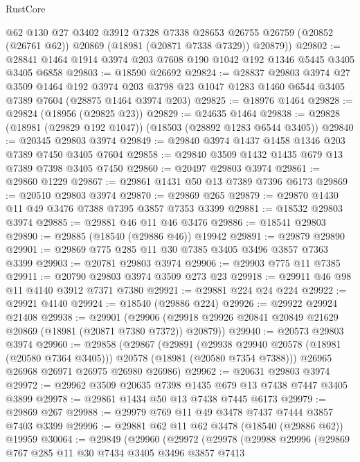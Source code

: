 \begin{lexlean}{RustCore}
\begin{coremodule}
        @62
        @130
        @27
        @3402
        @3912
        @7328
        @7338
        @28653
        @26755
        @26759
        (@20852 (@26761 @62))
        @20869
        (@18981 (@20871 @7338 @7329))
        @20879))
@29802 := @28841 @1464 @1914 @3974 @203 @7608 @190 @1042 @192 @1346 @5445 @3405 @3405 @6858
@29803 := @18590 @26692
@29824 := @28837
    @29803
    @3974
    @27
    @3509
    @1464
    @192
    @3974
    @203
    @3798
    @23
    @1047
    @1283
    @1460
    @6544
    @3405
    @7389
    @7604
    (@28875 @1464 @3974 @203)
@29825 := @18976 @1464
@29828 := @29824 (@18956 (@29825 @23))
@29829 := @24635 @1464
@29838 := @29828 (@18981 (@29829 @192 @1047)) (@18503 (@28892 @1283 @6544 @3405))
@29840 := @20345 @29803 @3974
@29849 := @29840 @3974 @1437 @1458 @1346 @203 @7389 @7450 @3405 @7604
@29858 := @29840 @3509 @1432 @1435 @679 @13 @7389 @7398 @3405 @7450
@29860 := @20497 @29803 @3974
@29861 := @29860 @1229
@29867 := @29861 @1431 @50 @13 @7389 @7396 @6173
@29869 := @20510 @29803 @3974
@29870 := @29869 @265
@29879 := @29870 @1430 @11 @49 @3476 @7388 @7395 @3857 @7353 @3399
@29881 := @18532 @29803 @3974
@29885 := @29881 @46 @11 @46 @3476
@29886 := @18541 @29803
@29890 := @29885 (@18540 (@29886 @46)) @19942
@29891 := @29879 @29890
@29901 := @29869 @775 @285 @11 @30 @7385 @3405 @3496 @3857 @7363 @3399
@29903 := @20781 @29803 @3974
@29906 := @29903 @775 @11 @7385
@29911 := @20790 @29803 @3974 @3509 @273 @23
@29918 := @29911 @46 @98 @11 @4140 @3912 @7371 @7380
@29921 := @29881 @224 @24 @224
@29922 := @29921 @4140
@29924 := @18540 (@29886 @224)
@29926 := @29922 @29924 @21408
@29938 := @29901
    (@29906 (@29918 @29926 @20841 @20849 @21629 @20869 (@18981 (@20871 @7380 @7372)) @20879))
@29940 := @20573 @29803 @3974
@29960 := @29858
    (@29867
      (@29891
        (@29938 @29940 @20578 (@18981 (@20580 @7364 @3405)))
        @20578
        (@18981 (@20580 @7354 @7388)))
      @26965
      @26968
      @26971
      @26975
      @26980
      @26986)
@29962 := @20631 @29803 @3974
@29972 := @29962 @3509 @20635 @7398 @1435 @679 @13 @7438 @7447 @3405 @3899
@29978 := @29861 @1434 @50 @13 @7438 @7445 @6173
@29979 := @29869 @267
@29988 := @29979 @769 @11 @49 @3478 @7437 @7444 @3857 @7403 @3399
@29996 := @29881 @62 @11 @62 @3478 (@18540 (@29886 @62)) @19959
@30064 := @29849
    (@29960
      (@29972
        (@29978
          (@29988
            @29996
            (@29869
              @767
              @285
              @11
              @30
              @7434
              @3405
              @3496
              @3857
              @7413

\end{coremodule}
\end{lexlean}
